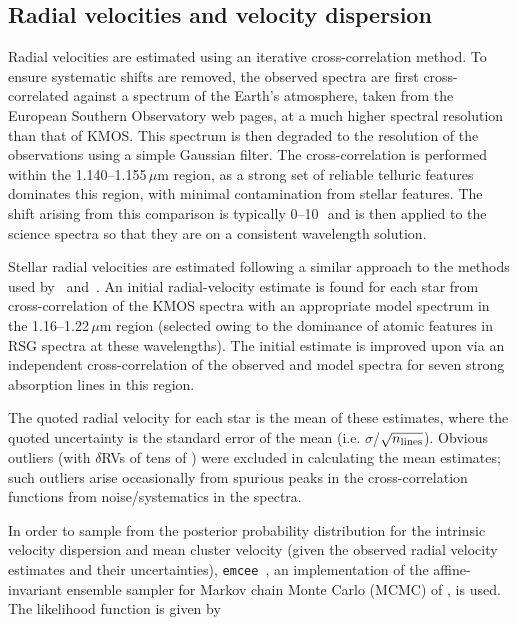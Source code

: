 \subsection{Radial velocities and velocity dispersion} %
\label{sub:radial_velocities}
Radial velocities are estimated using an iterative cross-correlation method.
To ensure systematic shifts are removed, the observed spectra are first cross-correlated against a spectrum of the Earth's atmosphere, taken from the European Southern Observatory web pages\footnotemark, at a much higher spectral resolution than that of KMOS.
This spectrum is then degraded to the resolution of the observations using a simple Gaussian filter.
The cross-correlation is performed within the 1.140--1.155\,$\mu$m region, as a strong set of reliable telluric features dominates this region, with minimal contamination from stellar features.
The shift arising from this comparison is typically 0--10\,\kms~and is then applied to the science spectra so that they are on a consistent wavelength solution.


Stellar radial velocities are estimated following a similar approach to the methods used by~\citet{2015ApJ...798...23L} and~\citet{2015ApJ...803...14P}. An initial radial-velocity estimate is found for each star from cross-correlation of the KMOS spectra with an appropriate model spectrum in the 1.16--1.22\,$\mu$m region
(selected owing to the dominance of atomic features in RSG spectra at these wavelengths).
The initial estimate is improved upon via an independent cross-correlation of the observed and model spectra for seven strong absorption lines in this region.

The quoted radial velocity for each star is the mean of these estimates, where the quoted uncertainty is the standard error of the mean
(i.e. $\sigma$/$\sqrt{n_{\rm lines}}$).
Obvious outliers (with $\delta$RVs of tens of \kms) were excluded in calculating the mean estimates; such outliers arise occasionally from spurious peaks in the cross-correlation functions from noise/systematics in the spectra.

In order to sample from the posterior probability distribution for the intrinsic velocity dispersion and mean cluster velocity (given the observed radial velocity estimates and their uncertainties), \texttt{emcee}~\citep{2013PASP..125..306F},
an implementation of the affine-invariant ensemble sampler for Markov chain Monte Carlo (MCMC) of \cite{2010CAMCS.5..65G}, is used. The likelihood function is given by

